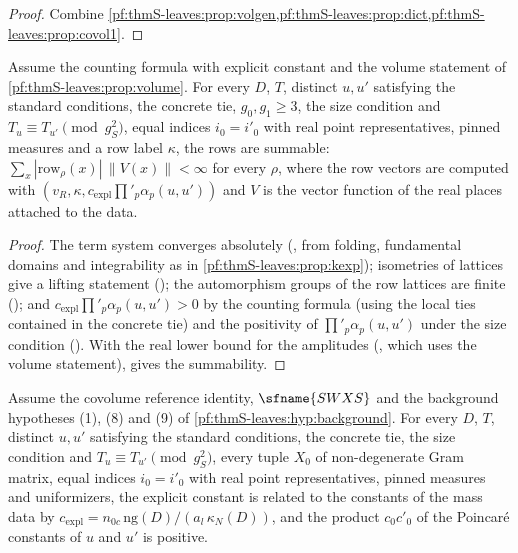 \begin{proof}
Combine \cref{pf:thmS-leaves:prop:volgen,pf:thmS-leaves:prop:dict,pf:thmS-leaves:prop:covol1}.
\end{proof}

\begin{proposition}\label{pf:thmS-leaves:prop:rowssum}
Assume the counting formula with explicit constant and the volume statement of \cref{pf:thmS-leaves:prop:volume}. For every $D$,
$T$, distinct $u,u'$ satisfying the standard conditions, the concrete tie, $g_0,g_1\ge3$, the size condition and
$T_u\equiv T_{u'}\pmod{g_S^2}$, equal indices $i_0=i'_0$ with real point representatives, pinned measures and a row label $\kappa$, the
rows are summable: $\sum_x|\mathrm{row}_\rho(x)|\,\|V(x)\|<\infty$ for every $\rho$, where the row vectors are computed with
$(v_R,\kappa,c_{\mathrm{expl}}\prod'_p\alpha_p(u,u'))$ and $V$ is the vector function of the real places attached to the data.
\end{proposition}

\begin{proof}
The term system converges absolutely (, from folding, fundamental domains and
integrability as in \cref{pf:thmS-leaves:prop:kexp}); isometries of lattices give a lifting statement
(); the automorphism groups of the row lattices are finite
(); and $c_{\mathrm{expl}}\prod'_p\alpha_p(u,u')>0$ by the counting formula (using the local ties
contained in the concrete tie) and the positivity of $\prod'_p\alpha_p(u,u')$ under the size condition
(). With the real lower bound for the amplitudes
(, which uses the volume statement),
 gives the summability.
\end{proof}

\begin{proposition}\label{pf:thmS-leaves:prop:nc}
Assume the covolume reference identity, $\sfname{SWXS}$ and the background hypotheses (1), (8) and (9) of
\cref{pf:thmS-leaves:hyp:background}. For every $D$, $T$, distinct $u,u'$ satisfying the standard conditions, the
concrete tie, the size condition and $T_u\equiv T_{u'}\pmod{g_S^2}$, every tuple $X_0$ of non-degenerate Gram matrix, equal indices
$i_0=i'_0$ with real point representatives, pinned measures and uniformizers, the explicit constant is related to the constants of
the mass data by
$c_{\mathrm{expl}}=n_{0c}\,\mathrm{ng}(D)/(a_l\,\kappa_N(D))$, and the product $c_0c'_0$ of the Poincar\'e constants of $u$ and $u'$ is positive.
\end{proposition}

